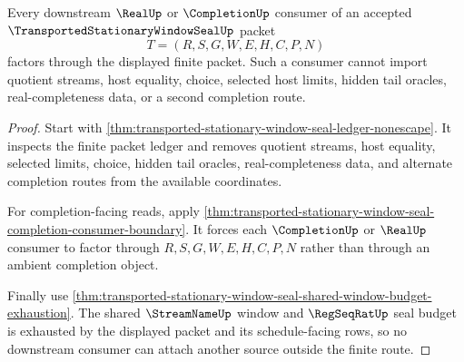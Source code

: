 \begin{theorem}
\label{thm:transported-stationary-window-seal-root-consumer-nonescape}
Every downstream $\RealUp$ or $\CompletionUp$ consumer of an accepted $\TransportedStationaryWindowSealUp$ packet
$$
T=(R,S,G,W,E,H,C,P,N)
$$
factors through the displayed finite packet. Such a consumer cannot import quotient streams, host equality, choice, selected host limits, hidden tail oracles, real-completeness data, or a second completion route.
\end{theorem}
\begin{proof}
Start with \autoref{thm:transported-stationary-window-seal-ledger-nonescape}. It inspects the finite packet ledger and removes quotient streams, host equality, selected limits, choice, hidden tail oracles, real-completeness data, and alternate completion routes from the available coordinates.

For completion-facing reads, apply \autoref{thm:transported-stationary-window-seal-completion-consumer-boundary}. It forces each $\CompletionUp$ or $\RealUp$ consumer to factor through $R,S,G,W,E,H,C,P,N$ rather than through an ambient completion object.

Finally use \autoref{thm:transported-stationary-window-seal-shared-window-budget-exhaustion}. The shared $\StreamNameUp$ window and $\RegSeqRatUp$ seal budget is exhausted by the displayed packet and its schedule-facing rows, so no downstream consumer can attach another source outside the finite route.
\end{proof}

